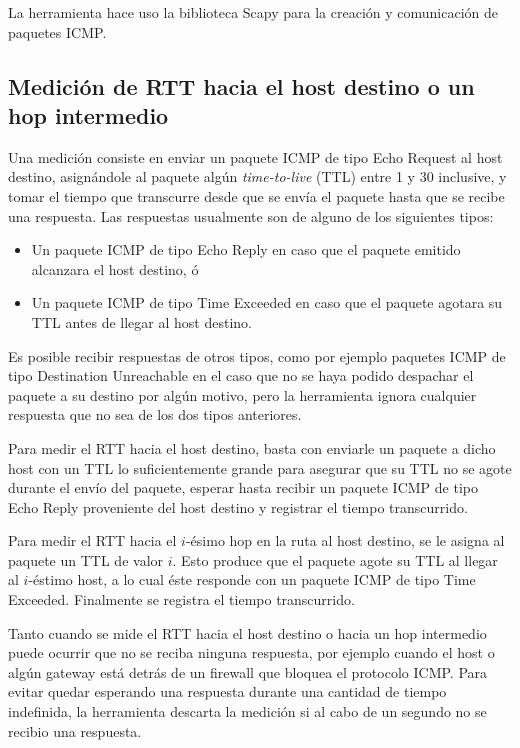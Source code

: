 \documentclass[a4paper, 10pt, twoside]{article}
\begin{document}
La herramienta hace uso la biblioteca Scapy \cite{scapy} para la creación y comunicación de paquetes ICMP.


\subsection{Medición de RTT hacia el host destino o un hop intermedio}

Una medición consiste en enviar un paquete ICMP de tipo Echo Request al host destino, asignándole al paquete algún \emph{time-to-live} (TTL) entre 1 y 30 inclusive, y tomar el tiempo que transcurre desde que se envía el paquete hasta que se recibe una respuesta. Las respuestas usualmente son de alguno de los siguientes tipos:

\begin{itemize}
  \item Un paquete ICMP de tipo Echo Reply en caso que el paquete emitido alcanzara el host destino, ó
  \item Un paquete ICMP de tipo Time Exceeded en caso que el paquete agotara su TTL antes de llegar al host destino.
\end{itemize}

Es posible recibir respuestas de otros tipos, como por ejemplo paquetes ICMP de tipo Destination Unreachable en el caso que no se haya podido despachar el paquete a su destino por algún motivo, pero la herramienta ignora cualquier respuesta que no sea de los dos tipos anteriores.

Para medir el RTT hacia el host destino, basta con enviarle un paquete a dicho host con un TTL lo suficientemente grande para asegurar que su TTL no se agote durante el envío del paquete, esperar hasta recibir un paquete ICMP de tipo Echo Reply proveniente del host destino y registrar el tiempo transcurrido.

Para medir el RTT hacia el $i$-ésimo hop en la ruta al host destino, se le asigna al paquete un TTL de valor $i$. Esto produce que el paquete agote su TTL al llegar al $i$-éstimo host, a lo cual éste responde con un paquete ICMP de tipo Time Exceeded. Finalmente se registra el tiempo transcurrido.

Tanto cuando se mide el RTT hacia el host destino o hacia un hop intermedio puede ocurrir que no se reciba ninguna respuesta, por ejemplo cuando el host o algún gateway está detrás de un firewall que bloquea el protocolo ICMP. Para evitar quedar esperando una respuesta durante una cantidad de tiempo indefinida, la herramienta descarta la medición si al cabo de un segundo no se recibio una respuesta.
\end{document}
